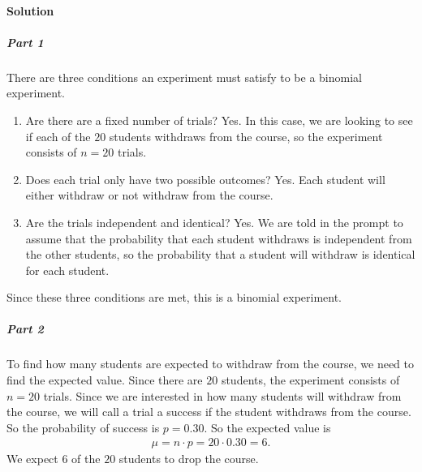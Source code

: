 \documentclass[letterpaper,10pt,english]{jupyterBook}
\begin{document}
\paragraph{Solution}
\label{\detokenize{Ch3 Probability/3.6 The Binomial Distribution:solution}}

\subparagraph{Part 1}
\label{\detokenize{Ch3 Probability/3.6 The Binomial Distribution:part-1}}
\sphinxAtStartPar
There are three conditions an experiment must satisfy to be a binomial experiment.
\begin{enumerate}
%
\item {} 
\sphinxAtStartPar
Are there are a fixed number of trials? Yes. In this case, we are looking to see if each of the \(20\) students withdraws from the course, so the experiment consists of \(n = 20\) trials.

\item {} 
\sphinxAtStartPar
Does each trial only have two possible outcomes? Yes. Each student will either withdraw or not withdraw from the course.

\item {} 
\sphinxAtStartPar
Are the trials independent and identical? Yes. We are told in the prompt to assume that the probability that each student withdraws is independent from the other students, so the probability that a student will withdraw is identical for each student.

\end{enumerate}

\sphinxAtStartPar
Since these three conditions are met, this is a binomial experiment.


\subparagraph{Part 2}
\label{\detokenize{Ch3 Probability/3.6 The Binomial Distribution:part-2}}
\sphinxAtStartPar
To find how many students are expected to withdraw from the course, we need to find the expected value. Since there are \(20\) students, the experiment consists of \(n = 20\) trials. Since we are interested in how many students will withdraw from the course, we will call a trial a success if the student withdraws from the course. So the probability of success is \(p = 0.30\). So the expected value is
\begin{equation*}
\begin{split} \mu = n \cdot p = 20 \cdot 0.30 = 6. \end{split}
\end{equation*}
\sphinxAtStartPar
We expect \(6\) of the \(20\) students to drop the course.
\end{document}
